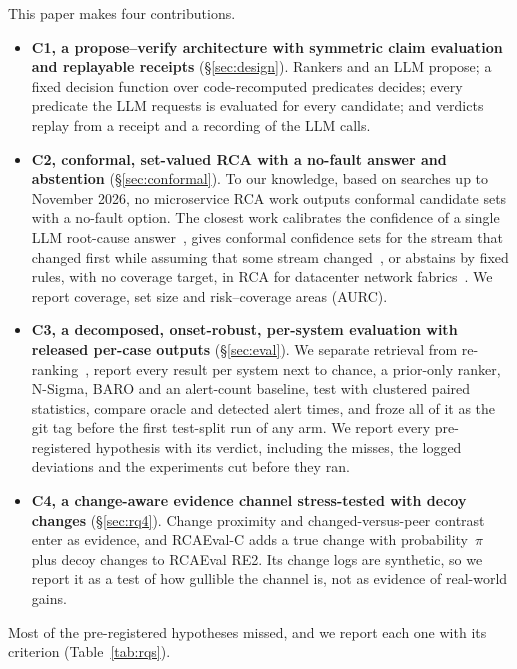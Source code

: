 This paper makes four contributions.
\begin{itemize}
\item \textbf{C1, a propose--verify architecture with symmetric claim evaluation and replayable receipts} (\S\ref{sec:design}). Rankers and an LLM propose; a fixed decision function over code-recomputed predicates decides; every predicate the LLM requests is evaluated for every candidate; and verdicts replay from a receipt and a recording of the LLM calls.
\item \textbf{C2, conformal, set-valued RCA with a no-fault answer and abstention} (\S\ref{sec:conformal}). To our knowledge, based on searches up to November 2026, no microservice RCA work outputs conformal candidate sets with a no-fault option. The closest work calibrates the confidence of a single LLM root-cause answer~\cite{lmpace2024}, gives conformal confidence sets for the stream that changed first while assuming that some stream changed~\cite{croc2026,conch2026}, or abstains by fixed rules, with no coverage target, in RCA for datacenter network fabrics~\cite{abstention2026osdi}. We report coverage, set size and risk--coverage areas (AURC).
\item \textbf{C3, a decomposed, onset-robust, per-system evaluation with released per-case outputs} (\S\ref{sec:eval}). We separate retrieval from re-ranking~\cite{decomprca2026}, report every result per system next to chance, a prior-only ranker, N-Sigma, BARO and an alert-count baseline, test with clustered paired statistics, compare oracle and detected alert times, and froze all of it as the git tag  before the first test-split run of any \sys arm. We report every pre-registered hypothesis with its verdict, including the misses, the logged deviations and the experiments cut before they ran.
\item \textbf{C4, a change-aware evidence channel stress-tested with decoy changes} (\S\ref{sec:rq4}). Change proximity and changed-versus-peer contrast enter as evidence, and RCAEval-C adds a true change with probability~$\pi$ plus decoy changes to RCAEval RE2. Its change logs are synthetic, so we report it as a test of how gullible the channel is, not as evidence of real-world gains.
\end{itemize}

Most of the pre-registered hypotheses missed, and we report each one with its criterion (Table~\ref{tab:rqs}).

